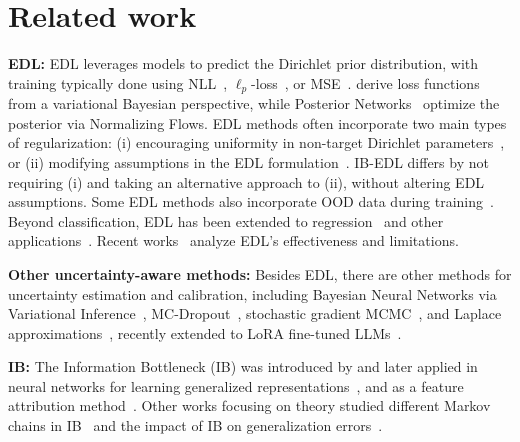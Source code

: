\section{Related work}

\textbf{EDL:} EDL leverages models to predict the Dirichlet prior distribution, with training typically done using NLL~\citep{haussmann2023bayesian}, $\ell_p$-loss~\citep{tsiligkaridis2021information}, or MSE~\citep{sensoy2018evidential}. \citet{chen2018variational,joo2020being,shen2023post} derive loss functions from a variational Bayesian perspective, while Posterior Networks~\citep{charpentier2020posterior,charpentier2022natural} optimize the posterior via Normalizing Flows. EDL methods often incorporate two main types of regularization: (i) encouraging uniformity in non-target Dirichlet parameters~\citep{malinin2018predictive,sensoy2018evidential,chen2018variational,tsiligkaridis2021information}, or (ii) modifying assumptions in the EDL formulation~\citep{deng2023uncertainty,chen2024redl}. IB-EDL differs by not requiring (i) and taking an alternative approach to (ii), without altering EDL assumptions. Some EDL methods also incorporate OOD data during training~\citep{malinin2018predictive,malinin2019reverse}. Beyond classification, EDL has been extended to regression~\citep{amini2020deep} and other applications~\citep{gao2024evidential,liu2024weakly}. Recent works~\citep{shen2024are,juergens2024is} analyze EDL’s effectiveness and limitations.

\textbf{Other uncertainty-aware methods:} Besides EDL, there are other methods for uncertainty estimation and calibration, including Bayesian Neural Networks via Variational Inference~\citep{graves2011practical,blundell2015weight}, MC-Dropout~\citep{gal2016dropout}, stochastic gradient MCMC~\citep{welling2011bayesian,ma2015complete}, and Laplace approximations~\citep{ritter2018scalable,kristiadi2021learnable}, recently extended to LoRA fine-tuned LLMs~\citep{yang2024lalora,wang2024blob, li2024mixlora}.

\textbf{IB:} The Information Bottleneck (IB) was introduced by \citet{tishby99information} and later applied in neural networks for learning generalized representations~\citep{tishby2015deep,alemi2017deep,sun2022graph}, and as a feature attribution method~\citep{schulz2020restricting,zhang2021fine,wang2023visual}. Other works focusing on theory studied different Markov chains in IB~\citep{wieczorek2020difference} and the impact of IB on generalization errors~\citep{kawaguchi2023does}.